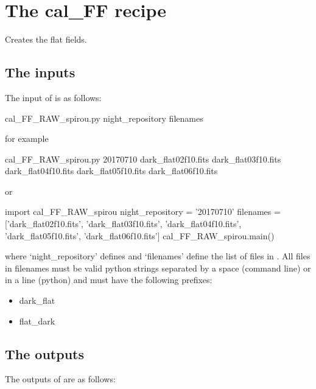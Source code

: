 \clearpage
\newpage
\section{The cal\_FF recipe}
\label{ch:the_recipes:cal_FF_RAW_spirou}

Creates the flat fields. \\ 

\subsection{The inputs}
The input of \calFFraw is as follows:
\begin{cmdbox}
cal_FF_RAW_spirou.py night_repository filenames
\end{cmdbox}
\noindent for example
\begin{cmdbox}[title={example}]
cal_FF_RAW_spirou.py 20170710 dark_flat02f10.fits dark_flat03f10.fits dark_flat04f10.fits dark_flat05f10.fits dark_flat06f10.fits
\end{cmdbox}
\noindent or
\begin{pythonbox}
import cal_FF_RAW_spirou
night_repository = '20170710'
filenames = ['dark_flat02f10.fits', 'dark_flat03f10.fits', 'dark_flat04f10.fits', 
             'dark_flat05f10.fits', 'dark_flat06f10.fits']
cal_FF_RAW_spirou.main()
\end{pythonbox}

\noindent where `night\_repository' defines \argnightname and `filenames' define the list of files in \argfilenames. All files in filenames must be valid python strings separated by a space (command line) or in a line (python) and must have the following prefixes:
\begin{itemize}
	\item dark\_flat
	\item flat\_dark
\end{itemize}

\subsection{The outputs}
The outputs of \calFFraw are as follows:

